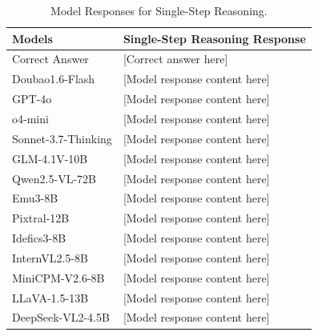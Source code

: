 \begin{table}[h]
\setlength{\tabcolsep}{3mm}
\centering
\small
\begin{tabular}{l|p{12cm}}
\toprule
\textbf{Models} & \textbf{Single-Step Reasoning Response} \\
\midrule
Correct Answer & [Correct answer here]\\
\midrule
Doubao1.6-Flash & [Model response content here] \\
\midrule
GPT-4o & [Model response content here] \\
\midrule
o4-mini & [Model response content here] \\
\midrule
Sonnet-3.7-Thinking & [Model response content here] \\
\midrule
GLM-4.1V-10B & [Model response content here] \\
\midrule
Qwen2.5-VL-72B & [Model response content here] \\
Emu3-8B & [Model response content here] \\
Pixtral-12B & [Model response content here] \\
Idefics3-8B & [Model response content here] \\
InternVL2.5-8B & [Model response content here] \\
MiniCPM-V2.6-8B & [Model response content here] \\
LLaVA-1.5-13B & [Model response content here] \\
DeepSeek-VL2-4.5B & [Model response content here] \\
\bottomrule
\end{tabular}
\begin{center}
\caption{Model Responses for Single-Step Reasoning.}
\end{center}
\label{tab:task1_responses}
\end{table}

